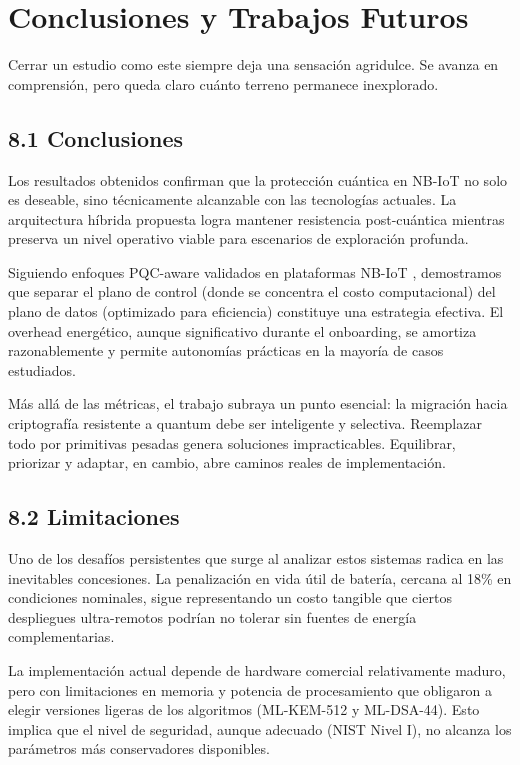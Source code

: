 \section{Conclusiones y Trabajos Futuros}

Cerrar un estudio como este siempre deja una sensación agridulce. Se avanza en comprensión, pero queda claro cuánto terreno permanece inexplorado.

\subsection{8.1 Conclusiones}

Los resultados obtenidos confirman que la protección cuántica en NB-IoT no solo es deseable, sino técnicamente alcanzable con las tecnologías actuales. La arquitectura híbrida propuesta logra mantener resistencia post-cuántica mientras preserva un nivel operativo viable para escenarios de exploración profunda. 

Siguiendo enfoques PQC-aware validados en plataformas NB-IoT \cite{Do2026_PQCAware}, demostramos que separar el plano de control (donde se concentra el costo computacional) del plano de datos (optimizado para eficiencia) constituye una estrategia efectiva. El overhead energético, aunque significativo durante el onboarding, se amortiza razonablemente y permite autonomías prácticas en la mayoría de casos estudiados. 

Más allá de las métricas, el trabajo subraya un punto esencial: la migración hacia criptografía resistente a quantum debe ser inteligente y selectiva. Reemplazar todo por primitivas pesadas genera soluciones impracticables. Equilibrar, priorizar y adaptar, en cambio, abre caminos reales de implementación.

\subsection{8.2 Limitaciones}

Uno de los desafíos persistentes que surge al analizar estos sistemas radica en las inevitables concesiones. La penalización en vida útil de batería, cercana al 18\% en condiciones nominales, sigue representando un costo tangible que ciertos despliegues ultra-remotos podrían no tolerar sin fuentes de energía complementarias.

La implementación actual depende de hardware comercial relativamente maduro, pero con limitaciones en memoria y potencia de procesamiento que obligaron a elegir versiones ligeras de los algoritmos (ML-KEM-512 y ML-DSA-44). Esto implica que el nivel de seguridad, aunque adecuado (NIST Nivel I), no alcanza los parámetros más conservadores disponibles. 

